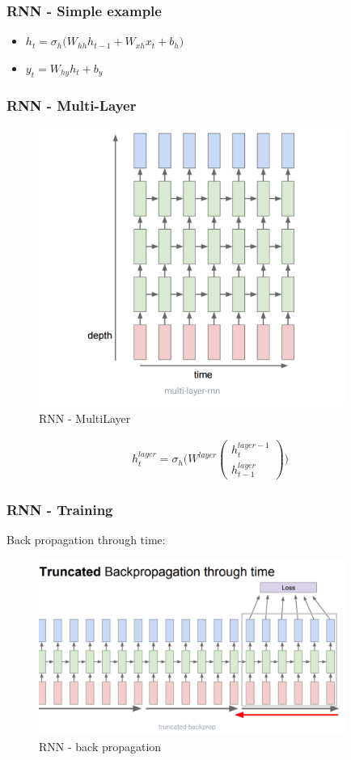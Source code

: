 \documentclass[12pt]{report}
\begin{document}
\subsubsection{RNN - Simple example}

\begin{itemize}
	\item $h_t = \sigma_h \big(W_{hh} h_{t-1} +  W_{xh} x_{t} + b_h\big)$
	\item $y_t  = W_{hy} h_{t} +  b_y$
\end{itemize}

\subsubsection{RNN - Multi-Layer}
\begin{figure}[H]\centering\includegraphics[width=10cm]{RNN_MULTI.png}\caption{RNN - MultiLayer}\end{figure}
\begin{align*}
	h_t^{layer} = \sigma_h \bigg(W^{layer} \begin{pmatrix}
		h_{t}^{layer-1} \\ h_{t-1}^{layer}
	\end{pmatrix} \bigg)
\end{align*}


\subsubsection{RNN - Training }
Back propagation through time:
\begin{figure}[H]\centering\includegraphics[width=10cm]{RNN_BACKPROP.png}\caption{RNN - back propagation}\end{figure}
\end{document}
